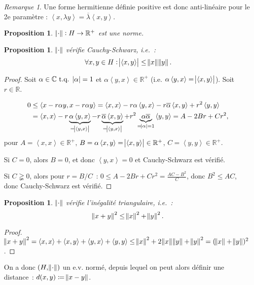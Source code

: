 \documentclass{report}
\newcommand{\C}{{\mathbb C}}
\newcommand{\R}{{\mathbb R}}
\newcommand{\scpr}[2]{\left\langle#1, #2\right\rangle}
\newcommand{\tq}{\text{ t.q. }}
\newtheorem{prp}[thm]{Proposition}
\theoremstyle{definition}
\theoremstyle{remark}
\newtheorem*{rmq}{Remarque}
\begin{document}
\begin{rmq} Une forme hermitienne définie positive est donc anti-linéaire pour le 2e paramètre : $\scpr x{\lambda y} = \overline \lambda \scpr xy$.
\end{rmq}

\begin{prp} $\norm \cdot : H \to \R^+$ est une norme.
\end{prp}

\begin{prp} $\norm \cdot$ vérifie Cauchy-Schwarz, i.e.~:
\[\forall x, y \in H : \abs {\scpr xy} \leq \norm x\norm y.\]
\end{prp}

\begin{proof} Soit $\alpha \in \C \tq \abs \alpha = 1$ et $\alpha\scpr yx \in \R^+$ (i.e. $\alpha\scpr yx = \abs {\scpr xy}$). Soit $r \in \R$.

\begin{align*}
	0 &\leq \scpr {x-r\alpha y}{x-r\alpha y} = \scpr xx - r\alpha\scpr yx - r\overline \alpha\scpr xy + r^2\scpr yy \\
		&= \scpr xx - r\underbrace {\alpha \scpr yx}_{= \abs {\scpr yx}} - r\underbrace {\overline \alpha \scpr xy}_{= \abs {\scpr yx}} + r^2\underbrace {\alpha\overline\alpha}_{= \abs \alpha = 1} \scpr yy = A - 2Br + Cr^2,
\end{align*}
pour $A = \scpr xx \in \R^+$, $B = \alpha\scpr xy = \abs {\scpr xy} \in \R^+$, $C = \scpr yy \in \R^+$.

Si $C = 0$, alors $B = 0$, et donc $\scpr yx = 0$ et Cauchy-Schwarz est vérifié.

Si $C \gneqq 0$, alors pour $r = B/C$~: $0 \leq A - 2Br + Cr^2 = \frac {AC-B^2}C$, donc $B^2 \leq AC$, donc Cauchy-Schwarz est vérifié.
\end{proof}

\begin{prp} $\norm \cdot$ vérifie l'inégalité triangulaire, i.e.~:
\[\norm {x+y}^2 \leq \norm x^2 + \norm y^2.\]
\end{prp}

\begin{proof} $\norm {x+y}^2 = \scpr xx + \scpr xy + \scpr yx + \scpr yy \leq \norm x^2 + 2\norm x\norm y + \norm y^2 = (\norm x + \norm y)^2$.
\end{proof}

On a donc $(H, \norm \cdot)$ un e.v. normé, depuis lequel on peut alors définir une distance~: $d(x, y) \coloneqq \norm {x-y}$.
\end{document}
